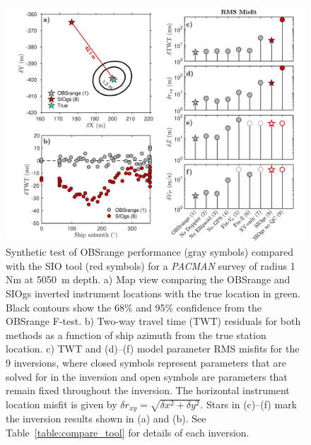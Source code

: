 \documentclass[10pt,titlepage]{article}
\begin{document}
\begin{figure}[h]
\includegraphics[trim=0cm 0cm 0cm 0cm,clip=true,width=\columnwidth]{Figure05.pdf}
\caption{ Synthetic test of OBSrange performance (gray symbols) compared with the SIO tool (red symbols) for a \textit{PACMAN} survey of radius 1 Nm at 5050~m depth. a) Map view comparing the OBSrange and SIOgs inverted instrument locations with the true location in green. Black contours show the 68\% and 95\% confidence from the OBSrange F-test. b) Two-way travel time (TWT) residuals for both methods as a function of ship azimuth from the true station location. c) TWT and (d)--(f) model parameter RMS misfits for the 9 inversions, where closed symbols represent parameters that are solved for in the inversion and open symbols are parameters that remain fixed throughout the inversion. The horizontal instrument location misfit is given by $\delta r_{xy} = \sqrt{\delta x^2 + \delta y^2} $. Stars in (c)--(f) mark the inversion results shown in (a) and (b). See Table~\ref{table:compare_tool} for details of each inversion.}
\label{fig:compare_tool}
\end{figure}

\newpage
\end{document}
